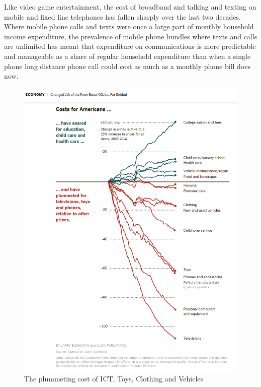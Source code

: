 Like video game entertainment, the cost of broadband and talking and texting on mobile and fixed line telephones has fallen sharply over the last two decades. Where mobile phone calls and texts were once a large part of monthly household income expenditure, the prevalence of mobile phone bundles where texts and calls are unlimited has meant that expenditure on communications is more predictable and manageable as a share of regular household expenditure than when a single phone long distance phone call could cost as much as a monthly phone bill does now.
\begin{figure}[ht]
\centering
\includegraphics[scale=0.4]{figures/ChangedLifeOfThePoor.png} 
\caption{The plummeting cost of ICT, Toys, Clothing and Vehicles\cite{RefWorks:323}}\label{fig:ICTCosts}
\end{figure}

